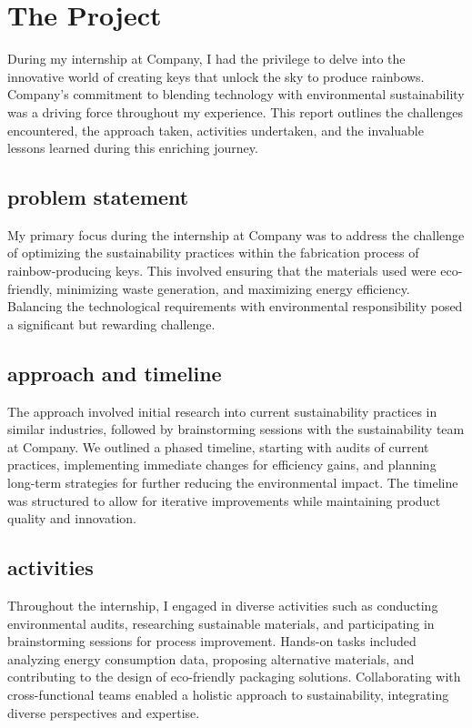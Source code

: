 \chapter{The Project}
\label{ch: The Project}

During my internship at Company, I had the privilege to delve into the innovative world of creating keys that unlock the sky to produce rainbows. Company’s commitment to blending technology with environmental sustainability was a driving force throughout my experience. This report outlines the challenges encountered, the approach taken, activities undertaken, and the invaluable lessons learned during this enriching journey. \cite{website}

\section{problem statement}
My primary focus during the internship at Company was to address the challenge of optimizing the sustainability practices within the fabrication process of rainbow-producing keys. This involved ensuring that the materials used were eco-friendly, minimizing waste generation, and maximizing energy efficiency. Balancing the technological requirements with environmental responsibility posed a significant but rewarding challenge.

\section{approach and timeline}
The approach involved initial research into current sustainability practices in similar industries, followed by brainstorming sessions with the sustainability team at Company. We outlined a phased timeline, starting with audits of current practices, implementing immediate changes for efficiency gains, and planning long-term strategies for further reducing the environmental impact. The timeline was structured to allow for iterative improvements while maintaining product quality and innovation. \cite{bible}

\section{activities}
Throughout the internship, I engaged in diverse activities such as conducting environmental audits, researching sustainable materials, and participating in brainstorming sessions for process improvement. Hands-on tasks included analyzing energy consumption data, proposing alternative materials, and contributing to the design of eco-friendly packaging solutions. Collaborating with cross-functional teams enabled a holistic approach to sustainability, integrating diverse perspectives and expertise.

